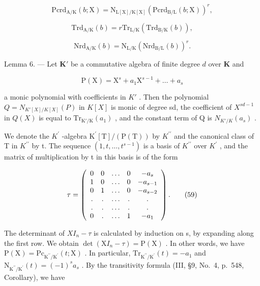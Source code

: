\[
\mathrm{Pcrd} _ {\mathrm{A/K}} (b; \mathrm{X}) = \mathrm{N} _ {\mathrm{L[X]/K[X]}} (\mathrm{Pcrd} _ {\mathrm{B/L}} (b; \mathrm{X})) ^ {r},\tag{56}
\]

\[
\mathrm{Trd} _ {\mathrm{A/K}} (b) = r \mathrm{Tr} _ {\mathrm{L/K}} (\mathrm{Trd} _ {\mathrm{B/K}} (b)),\tag{57}
\]

\[
\mathrm{Nrd} _ {\mathrm{A/K}} (b) = \mathrm{N} _ {\mathrm{L/K}} (\mathrm{Nrd} _ {\mathrm{B/L}} (b)) ^ {r}.\tag{58}
\]

Lemma 6. --- Let \(\mathbf{K}'\) be a commutative algebra of finite degree \(d\) over \(\mathbf{K}\) and

\[
\mathrm{P} (\mathrm{X}) = \mathrm{X} ^ {s} + a _ {1} \mathrm{X} ^ {s - 1} + \dots + a _ {s}
\]

a monic polynomial with coefficients in \(K'\) . Then the polynomial \(Q = N_{K'[X]/K[X]}(P)\) in \(K[X]\) is monic of degree sd, the coefficient of \(X^{sd-1}\) in \(Q(X)\) is equal to \(\mathrm{Tr}_{\mathrm{K}'/\mathrm{K}}(a_1)\) , and the constant term of Q is \(N_{K'/K}(a_s)\) .

We denote the \(K^{\prime}\) -algebra \(\mathrm{K}^{\prime}[\mathrm{T}]/( \mathrm{P}(\mathrm{T}))\) by \(K^{\prime\prime}\) and the canonical class of T in \(K^{\prime\prime}\) by t. The sequence \((1, t, \ldots, t^{s-1})\) is a basis of \(K^{\prime\prime}\) over \(K^{\prime}\) , and the matrix of multiplication by t in this basis is of the form

\[
\tau = \left( \begin{array}{c c c c c} 0 & 0 & \dots & 0 & - a _ {s} \\ 1 & 0 & \dots & 0 & - a _ {s - 1} \\ 0 & 1 & \dots & 0 & - a _ {s - 2} \\ . & . & \dots & . & . \\ . & . & \dots & . & . \\ 0 & . & \dots & 1 & - a _ {1} \end{array} \right).\tag{59}
\]

The determinant of \(XI_{n}-\tau\) is calculated by induction on s, by expanding along the first row. We obtain \(\det(\mathrm{X}I_{n}-\tau)=\mathrm{P}(\mathrm{X})\) . In other words, we have \(\mathrm{P}(\mathrm{X})=\mathrm{P}\mathrm{c}_{\mathrm{K}^{\prime\prime}/\mathrm{K}^{\prime}}(t;\mathrm{X})\) . In particular, \(\mathrm{Tr}_{\mathrm{K}^{\prime\prime}/\mathrm{K}^{\prime}}(t)=-a_{1}\) and \(\mathrm{N}_{\mathrm{K}^{\prime\prime}/\mathrm{K}^{\prime}}(t)=(-1)^{s}a_{s}\) . By the transitivity formula (III, §9, No.~4, p.~548, Corollary), we have

